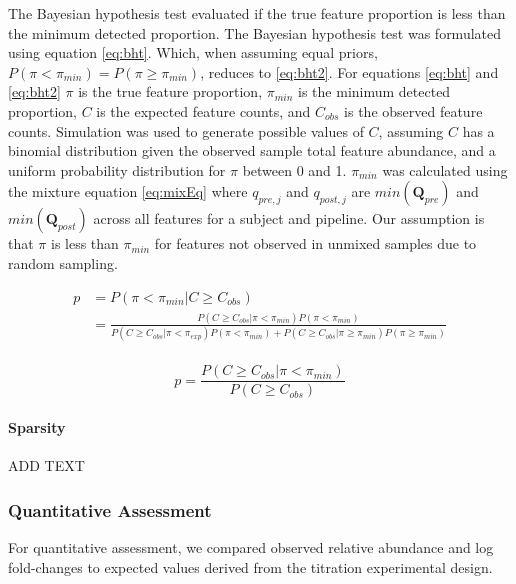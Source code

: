 \documentclass[linenumbers]{bmcart}
\begin{document}
The Bayesian hypothesis test evaluated if the true feature
proportion is less than the minimum detected proportion. The Bayesian
hypothesis test was formulated using equation \eqref{eq:bht}. Which, when
assuming equal priors, \(P(\pi < \pi_{min}) = P(\pi \geq \pi_{min})\),
reduces to \eqref{eq:bht2}. For equations \eqref{eq:bht} and \eqref{eq:bht2}
\(\pi\) is the true feature proportion, \(\pi_{min}\) is the minimum
detected proportion, \(C\) is the expected feature counts, and
\(C_{obs}\) is the observed feature counts. Simulation was used to
generate possible values of \(C\), assuming \(C\) has a binomial
distribution given the observed sample total feature abundance, and a
uniform probability distribution for \(\pi\) between 0 and 1.
\(\pi_{min}\) was calculated using the mixture equation \eqref{eq:mixEq}
where \(q_{pre,j}\) and \(q_{post,j}\) are \(min(\textbf{Q}_{pre})\) and
\(min(\textbf{Q}_{post})\) across all features for a subject and
pipeline. Our assumption is that \(\pi\) is less than \(\pi_{min}\) for
features not observed in unmixed samples due to random sampling.

\begin{equation}
  \begin{split}
    p & = P(\pi < \pi_{min} | C \geq C_{obs}) \\
      & = \frac{P(C \geq C_{obs}| \pi < \pi_{min})P(\pi < \pi_{min})}{P(C \geq C_{obs}| \pi < \pi_{exp})P(\pi < \pi_{min}) + P(C \geq C_{obs}| \pi \geq \pi_{min})P(\pi \geq \pi_{min})} \\
  \end{split}
  \label{eq:bht}
\end{equation}

\begin{equation}
p = \frac{P(C \geq C_{obs}| \pi < \pi_{min})}{P(C \geq C_{obs})}
  \label{eq:bht2}
\end{equation}

\paragraph{Sparsity}
ADD TEXT


\subsubsection*{Quantitative Assessment}
For quantitative assessment, we compared observed relative abundance and
log fold-changes to expected values derived from the titration
experimental design.
\end{document}
